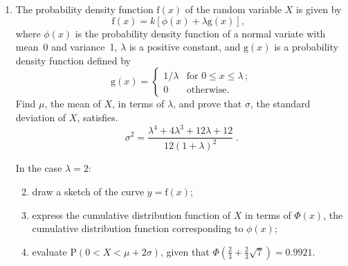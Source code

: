\documentclass[a4, 11pt]{report}
\newlength{\qspace}
\newcounter{qnumber}
\newenvironment{question}%
 {\vspace{\qspace}
  \begin{enumerate}[\bfseries 1\quad][10]%
    \setcounter{enumi}{\value{qnumber}}%
    \item%
 }
{
  \end{enumerate}
  \filbreak
  \stepcounter{qnumber}
 }
\newenvironment{questionparts}[1][1]%
 {
  \begin{enumerate}[\bfseries (i)]%
    \setcounter{enumii}{#1}
    \addtocounter{enumii}{-1}
    \setlength{\itemsep}{5mm}
    \setlength{\parskip}{8pt}
 }
 {
  \end{enumerate}
 }
\def\g{{\mathrm g}}
\def\f{{\mathrm f}}
\def\P{{\mathrm P}}
\def\le{\leqslant}
\begin{document}
\begin{question}
The probability density function $\f(x)$
of the random variable $X$ is given by
$$
\f(x) = k\left[{\phi}(x) + {\lambda}\g(x)\right],\,\,\,\,
$$
where 
${\phi}(x)$ is the probability density function  
of a normal variate with mean~0 and variance~1, 
$\lambda $ is a positive constant, and $\g(x)$ is a probability density function defined by
\[
\g(x)=
\begin{cases}
1/\lambda  & \mbox{for $0 \le x \le {\lambda}$}\,;\\
             0& \mbox{otherwise} .
\end{cases}
\]
Find $\mu$, the mean of $X$, in terms of $\lambda$, and prove that 
$\sigma$, the standard deviation of $X$, satisfies.
$$
\sigma^2 = \frac{\lambda^4 +4{\lambda}^3+12{\lambda}+12} 
         {12(1 + \lambda )^2}\;.
$$ 

In  the case $\lambda=2$:
\begin{questionparts}
\item draw a sketch of the curve $y=\f(x)$;
\item express the cumulative distribution function of $X$ in terms of $\Phi(x)$,
the cumulative distribution function corresponding to $\phi(x)$;
\item evaluate $\P(0<X<\mu+2\sigma)$, given that 
$\Phi (\frac 23 + \frac23 \surd7)=0.9921$. 


\end{questionparts}
\end{question}
	
\end{document}
